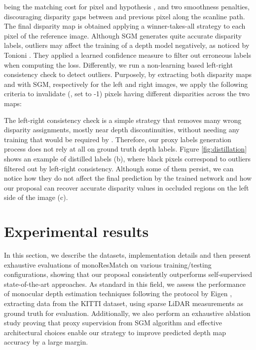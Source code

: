 \documentclass[10pt,twocolumn,letterpaper]{article}
\begin{document}
being  the matching cost for pixel  and hypothesis ,  and  two smoothness penalties, discouraging disparity gaps between  and previous pixel  along the scanline path. The final disparity map  is obtained applying a winner-takes-all strategy to each pixel of the reference image. Although SGM generates quite accurate disparity labels, outliers may affect the training of a depth model negatively, as noticed by Tonioni \etal \cite{Tonioni_2017_ICCV}. They applied a learned confidence measure \cite{Poggi_2016_BMVC} to filter out erroneous labels when computing the loss. Differently, we run a non-learning based left-right consistency check to detect outliers. Purposely, by extracting both disparity maps  and  with SGM, respectively for the left and right images, we apply the following criteria to invalidate (\ie, set to -1) pixels having different disparities across the two maps:



The left-right consistency check is a simple strategy that removes many wrong disparity assignments, mostly near depth discontinuities, without needing any training that would be required by \cite{Tonioni_2017_ICCV}. Therefore, our proxy labels generation process does not rely at all on ground truth depth labels. 
Figure \ref{fig:distillation} shows an example of distilled labels (b), where black pixels correspond to outliers filtered out by left-right consistency. Although some of them persist, we can notice how they do not affect the final prediction by the trained network and how our proposal can recover accurate disparity values in occluded regions on the left side of the image (c).



\section{Experimental results}\label{sec:experiments}

In this section, we describe the datasets, implementation details and then present exhaustive evaluations of monoResMatch on various training/testing configurations, showing that our proposal consistently outperforms self-supervised state-of-the-art approaches. As standard in this field, we assess the performance of monocular depth estimation techniques following the protocol by Eigen \etal \cite{eigen2014depth}, extracting data from the KITTI \cite{KITTI_RAW} dataset, using sparse LiDAR measurements as ground truth for evaluation. Additionally, we also perform an exhaustive ablation study proving that proxy supervision from SGM algorithm and effective architectural choices enable our strategy to improve predicted depth map accuracy by a large margin. 
\end{document}
